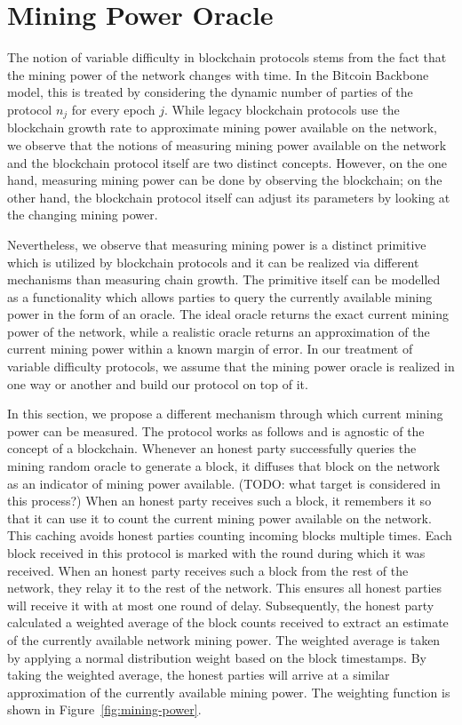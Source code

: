 \section{Mining Power Oracle}

The notion of variable difficulty in blockchain protocols stems from the fact that the mining power of the network changes with time. In the Bitcoin Backbone model, this is treated by considering the dynamic number of parties of the protocol $n_j$ for every epoch $j$. While legacy blockchain protocols use the blockchain growth rate to approximate mining power available on the network, we observe that the notions of measuring mining power available on the network and the blockchain protocol itself are two distinct concepts. However, on the one hand, measuring mining power can be done by observing the blockchain; on the other hand, the blockchain protocol itself can adjust its parameters by looking at the changing mining power.

Nevertheless, we observe that measuring mining power is a distinct primitive which is utilized by blockchain protocols and it can be realized via different mechanisms than measuring chain growth. The primitive itself can be modelled as a functionality which allows parties to query the currently available mining power in the form of an oracle. The ideal oracle returns the exact current mining power of the network, while a realistic oracle returns an approximation of the current mining power within a known margin of error. In our treatment of variable difficulty protocols, we assume that the mining power oracle is realized in one way or another and build our protocol on top of it.

In this section, we propose a different mechanism through which current mining power can be measured. The protocol works as follows and is agnostic of the concept of a blockchain. Whenever an honest party successfully queries the mining random oracle to generate a block, it diffuses that block on the network as an indicator of mining power available. (TODO: what target is considered in this process?) When an honest party receives such a block, it remembers it so that it can use it to count the current mining power available on the network. This caching avoids honest parties counting incoming blocks multiple times. Each block received in this protocol is marked with the round during which it was received. When an honest party receives such a block from the rest of the network, they relay it to the rest of the network. This ensures all honest parties will receive it with at most one round of delay. Subsequently, the honest party calculated a weighted average of the block counts received to extract an estimate of the currently available network mining power. The weighted average is taken by applying a normal distribution weight based on the block timestamps. By taking the weighted average, the honest parties will arrive at a similar approximation of the currently available mining power. The weighting function is shown in Figure~\ref{fig:mining-power}.

